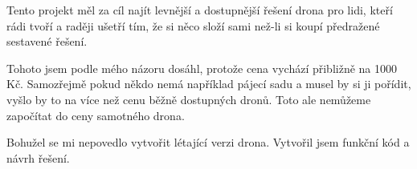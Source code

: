 Tento projekt měl za cíl najít levnější a dostupnější řešení drona pro lidi, kteří rádi tvoří a raději ušetří tím, že si něco složí sami než-li si koupí předražené sestavené řešení.

Tohoto jsem podle mého názoru dosáhl, protože cena vychází přibližně na 1000 Kč. Samozřejmě pokud někdo nemá například pájecí sadu a musel by si ji pořídit, vyšlo by to na více než cenu běžně dostupných dronů. Toto ale nemůžeme započítat do ceny samotného drona.

Bohužel se mi nepovedlo vytvořit létající verzi drona. Vytvořil jsem funkční kód a návrh řešení.
